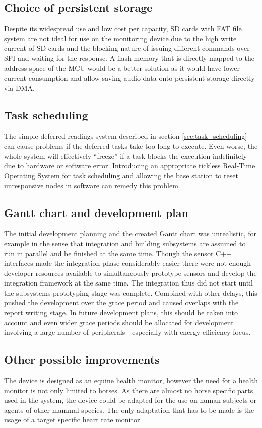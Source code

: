\subsection{Choice of persistent storage}
Despite its widespread use and low cost per capacity, SD cards with FAT file system are not ideal for use on the monitoring device due to the high write current of SD cards and the blocking nature of issuing different commands over SPI and waiting for the response. A flash memory that is directly mapped to the address space of the MCU would be a better solution as it would have lower current consumption and allow saving audio data onto persistent storage directly via DMA.

\subsection{Task scheduling}
The simple deferred readings system described in section \ref{sec:task_scheduling} can cause problems if the deferred tasks take too long to execute. Even worse, the whole system will effectively “freeze” if a task blocks the execution indefinitely due to hardware or software error. Introducing an appropriate tickless Real-Time Operating System for task scheduling and allowing the base station to reset unresponsive nodes in software can remedy this problem.

\subsection{Gantt chart and development plan}
The initial development planning and the created Gantt chart was unrealistic, for example in the sense that integration and building subsystems are assumed to run in parallel and be finished at the same time. Though the sensor C++ interfaces made the integration phase considerably easier there were not enough developer resources available to simultaneously prototype sensors and develop the integration framework at the same time. The integration thus did not start until the subsystems prototyping stage was complete. Combined with other delays, this pushed the development over the grace period and caused overlaps with the report writing stage. In future development plans, this should be taken into account and even wider grace periods should be allocated for development involving a large number of peripherals - especially with energy efficiency focus.

\subsection{Other possible improvements}
The device is designed as an equine health monitor, however the need for a health monitor is not only limited to horses. As there are almost no horse specific parts used in the system, the device could be adapted for the use on human subjects or agents of other mammal species. The only adaptation that has to be made is the usage of a target specific heart rate monitor. 

